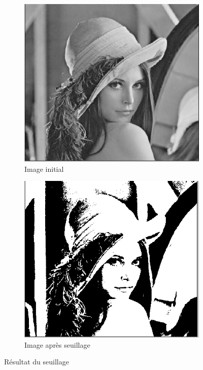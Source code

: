 \documentclass[12pt, letterpaper]{article}
\begin{document}
\begin{figure}[h!]
    \centering
    \begin{subfigure}[b]{0.7\linewidth}
      \includegraphics[width=\linewidth]{img/fig5.PNG}
      \caption{Image initial}
    \end{subfigure}
    \begin{subfigure}[b]{0.7\linewidth}
      \includegraphics[width=\linewidth]{img/fig14.PNG}
      \caption{Image après seuillage}
    \end{subfigure}
    \caption{Résultat du seuillage}
    \label{fig:seuil}
\end{figure}
\end{document}
